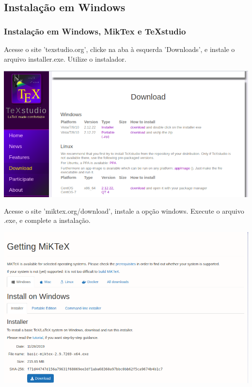 \documentclass{beamer}
\begin{document}
\begin{frame}

  \section{Instalação em Windows}

  \frametitle{Instalação em Windows, MikTex e TeXstudio}

  Acesse o site 'texstudio.org', clicke na aba à esquerda 'Downloads',
  e instale o arquivo installer.exe. Utilize o instalador.

  \begin{center}
    \includegraphics[scale=0.15]{../Imagens/W1.png}
  \end{center}

  \pause

  Acesse o site 'miktex.org/download', instale a opção
  windows. Execute o arquivo .exe, e complete a instalação.

  \begin{center}
    \includegraphics[scale=0.16]{../Imagens/W2.png}
  \end{center}

\end{frame}
\end{document}
